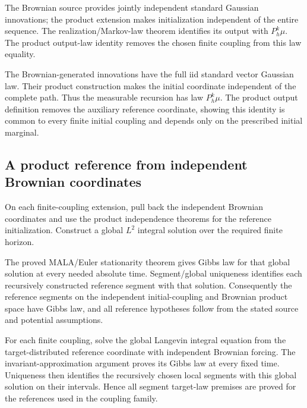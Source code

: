 \documentclass[11pt,a4paper]{report}
\begin{document}
The Brownian source provides jointly independent standard Gaussian innovations; the product extension makes initialization independent of the entire sequence. The realization/\allowbreak{}Markov-law theorem identifies its output with \(P_h^k\mu\). The product output-law identity removes the chosen finite coupling from this law equality.



The Brownian-generated innovations have the full iid standard vector Gaussian law. Their product construction makes the initial coordinate independent of the complete path. Thus the measurable recursion has law \(P_h^k\mu\). The product output definition removes the auxiliary reference coordinate, showing this identity is common to every finite initial coupling and depends only on the prescribed initial marginal.

\subsection{\texorpdfstring{A product reference from independent Brownian coordinates}{A product reference from independent Brownian coordinates}}
\label{report-step-UnadjustedLangevin-CanonicalULA-lean-2}


On each finite-coupling extension, pull back the independent Brownian coordinates and use the product independence theorems for the reference initialization. Construct a global \(L^2\) integral solution over the required finite horizon.



The proved MALA/\allowbreak{}Euler stationarity theorem gives Gibbs law for that global solution at every needed absolute time. Segment/\allowbreak{}global uniqueness identifies each recursively constructed reference segment with that solution. Consequently the reference segments on the independent initial-coupling and Brownian product space have Gibbs law, and all reference hypotheses follow from the stated source and potential assumptions.



For each finite coupling, solve the global Langevin integral equation from the target-distributed reference coordinate with independent Brownian forcing. The invariant-approximation argument proves its Gibbs law at every fixed time. Uniqueness then identifies the recursively chosen local segments with this global solution on their intervals. Hence all segment target-law premises are proved for the references used in the coupling family.
\end{document}
